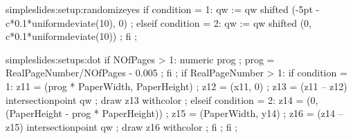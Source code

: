 



\unprotect


\startsetups simpleslides:setup:randomizeyes
if condition = 1:
  qw := qw shifted (-5pt - c*0.1*uniformdeviate(10), 0) ;
elseif condition = 2:
  qw := qw shifted (0, c*0.1*uniformdeviate(10)) ;
fi ;
\stopuseMPgraphic
\stopsetups

\startsetups simpleslides:setups:dot
if NOfPages > 1:
  numeric prog ; prog = RealPageNumber/NOfPages - 0.005 ;
fi ;
if RealPageNumber > 1:
  if condition = 1:
    z11 = (prog * PaperWidth, PaperHeight) ;
    z12 = (x11, 0) ;
    z13 = (z11 -- z12) intersectionpoint qw ;
    draw z13 withcolor  ;
  elseif condition = 2:
    z14 = (0, (PaperHeight - prog * PaperHeight)) ;
    z15 = (PaperWidth, y14) ;
    z16 = (z14 -- z15) intersectionpoint qw ;
    draw z16 withcolor  ;
  fi ;
fi ;
\stopuseMPgraphic
\stopsetups

